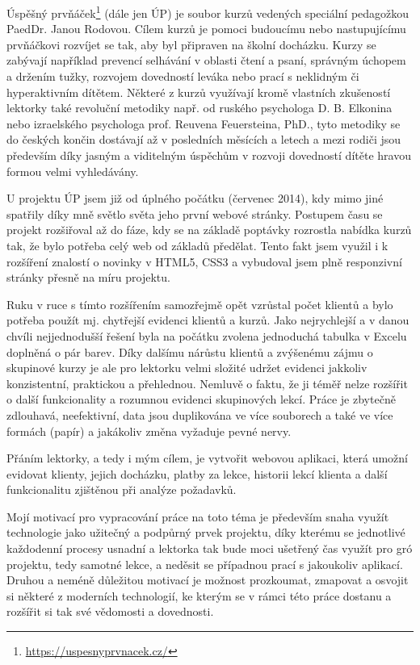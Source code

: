 Úspěšný prvňáček\footnote{\url{https://uspesnyprvnacek.cz/}} (dále jen ÚP) je soubor kurzů vedených speciální pedagožkou PaedDr. Janou Rodovou. Cílem kurzů je pomoci budoucímu nebo nastupujícímu prvňáčkovi rozvíjet se tak, aby byl připraven na školní docházku. Kurzy se zabývají například prevencí selhávání v oblasti čtení a psaní, správným úchopem a držením tužky, rozvojem dovedností leváka nebo prací s neklidným či hyperaktivním dítětem. Některé z kurzů využívají kromě vlastních zkušeností lektorky také revoluční metodiky např. od ruského psychologa D. B. Elkonina nebo izraelského psychologa prof. Reuvena Feuersteina, PhD., tyto metodiky se do českých končin dostávají až v posledních měsících a letech a mezi rodiči jsou především díky jasným a viditelným úspěchům v rozvoji dovedností dítěte hravou formou velmi vyhledávány.

U projektu ÚP jsem již od úplného počátku (červenec 2014), kdy mimo jiné spatřily díky mně světlo světa jeho první webové stránky. Postupem času se projekt rozšiřoval až do fáze, kdy se na základě poptávky rozrostla nabídka kurzů tak, že bylo potřeba celý web od základů předělat. Tento fakt jsem využil i k rozšíření znalostí o novinky v HTML5, CSS3 a vybudoval jsem plně responzivní stránky přesně na míru projektu.

Ruku v ruce s tímto rozšířením samozřejmě opět vzrůstal počet klientů a bylo potřeba použít mj. chytřejší evidenci klientů a kurzů. Jako nejrychlejší a v danou chvíli nejjednodušší řešení byla na počátku zvolena jednoduchá tabulka v Excelu doplněná o pár barev. Díky dalšímu nárůstu klientů a zvýšenému zájmu o skupinové kurzy je ale pro lektorku velmi složité udržet evidenci jakkoliv konzistentní, praktickou a přehlednou. Nemluvě o faktu, že ji téměř nelze rozšířit o další funkcionality a rozumnou evidenci skupinových lekcí. Práce je zbytečně zdlouhavá, neefektivní, data jsou duplikována ve více souborech a také ve více formách (papír) a jakákoliv změna vyžaduje pevné nervy.

Přáním lektorky, a tedy i mým cílem, je vytvořit webovou aplikaci, která umožní evidovat klienty, jejich docházku, platby za lekce, historii lekcí klienta a další funkcionalitu zjištěnou při analýze požadavků.

Mojí motivací pro vypracování práce na toto téma je především snaha využít technologie jako užitečný a podpůrný prvek projektu, díky kterému se jednotlivé každodenní procesy usnadní a lektorka tak bude moci ušetřený čas využít pro gró projektu, tedy samotné lekce, a neděsit se případnou prací s jakoukoliv aplikací. Druhou a neméně důležitou motivací je možnost prozkoumat, zmapovat a osvojit si některé z moderních technologií, ke kterým se v rámci této práce dostanu a rozšířit si tak své vědomosti a dovednosti.

